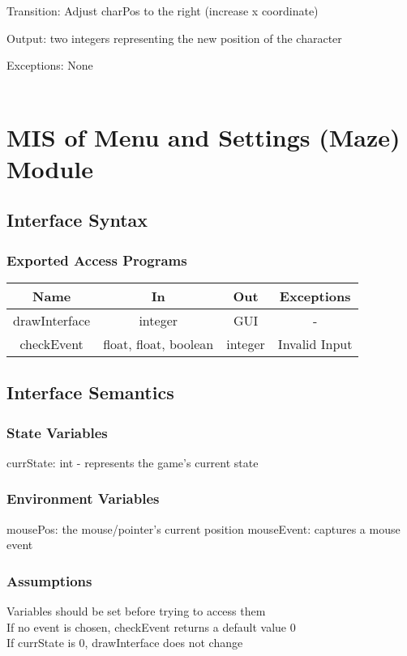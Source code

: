 \documentclass[12pt, titlepage]{article}
\begin{document}
		Transition: Adjust charPos to the right (increase x coordinate) 
		
		Output: two integers representing the new position of the character
		
		Exceptions: None\\
		\\
		
\section{MIS of Menu and Settings (Maze) Module}
		\subsection{Interface Syntax}
		\subsubsection{Exported Access Programs}
		\begin{tabular}[pos]{|c|c|c|c|}
			\hline
			\textbf{Name}& \textbf{In} & \textbf{Out} & \textbf{Exceptions} \\ \hline
			drawInterface & integer & GUI & - \\ \hline
			checkEvent & float, float, boolean & integer & Invalid Input \\ \hline
			
		\end{tabular}
		
		\subsection{Interface Semantics}
		\subsubsection{State Variables}
		currState: int - represents the game's current state
		
		\subsubsection{Environment Variables}
		mousePos: the mouse/pointer's current position
		mouseEvent: captures a mouse event 
		\subsubsection{Assumptions}
		Variables should be set before trying to access them \\ 
		If no event is chosen, checkEvent returns a default value 0 \\
		If currState is 0, drawInterface does not change \\
		
\end{document}

